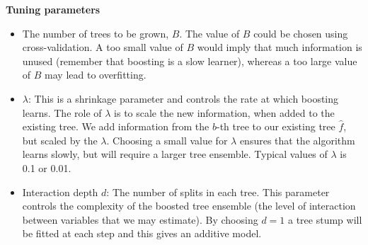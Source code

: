 \documentclass[10pt,ignorenonframetext,]{beamer}
\providecommand{\tightlist}{%
  \setlength{\itemsep}{0pt}\setlength{\parskip}{0pt}}
\begin{document}
\begin{frame}

\textbf{Tuning parameters}

\begin{itemize}
\tightlist
\item
  The number of trees to be grown, \(B\). The value of \(B\) could be
  chosen using cross-validation. A too small value of \(B\) would imply
  that much information is unused (remember that boosting is a slow
  learner), whereas a too large value of \(B\) may lead to overfitting.
\item
  \(\lambda\): This is a shrinkage parameter and controls the rate at
  which boosting learns. The role of \(\lambda\) is to scale the new
  information, when added to the existing tree. We add information from
  the \(b\)-th tree to our existing tree \(\hat{f}\), but scaled by the
  \(\lambda\). Choosing a small value for \(\lambda\) ensures that the
  algorithm learns slowly, but will require a larger tree ensemble.
  Typical values of \(\lambda\) is 0.1 or 0.01.
\item
  Interaction depth \(d\): The number of splits in each tree. This
  parameter controls the complexity of the boosted tree ensemble (the
  level of interaction between variables that we may estimate). By
  choosing \(d=1\) a tree stump will be fitted at each step and this
  gives an additive model.
\end{itemize}

\end{frame}
\end{document}
